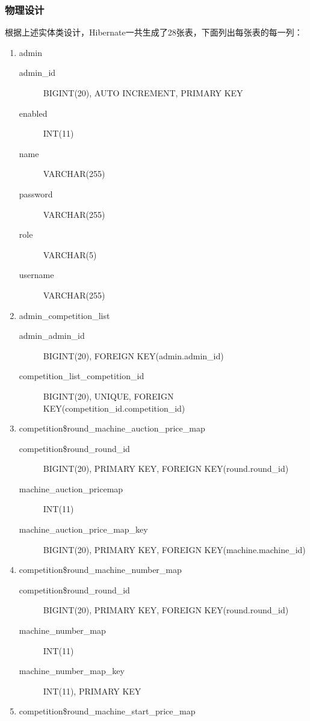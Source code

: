 \documentclass{article}
\begin{document}
\subsubsection{物理设计}
根据上述实体类设计，Hibernate一共生成了28张表，下面列出每张表的每一列：
\small{
\begin{enumerate}
  \item admin
    \begin{description}
      \item [admin\_id] BIGINT(20), AUTO INCREMENT, PRIMARY KEY
      \item [enabled] INT(11)
      \item [name] VARCHAR(255)
      \item [password] VARCHAR(255)
      \item [role] VARCHAR(5)
      \item [username] VARCHAR(255)
    \end{description}
  \item admin\_competition\_list
    \begin{description}
      \item[admin\_admin\_id] BIGINT(20), FOREIGN KEY(admin.admin\_id)
      \item[competition\_list\_competition\_id] BIGINT(20), UNIQUE, FOREIGN KEY(competition\_id.competition\_id)
    \end{description}
  \item competition\$round\_machine\_auction\_price\_map
    \begin{description}
      \item[competition\$round\_round\_id] BIGINT(20), PRIMARY KEY, FOREIGN KEY(round.round\_id)
      \item[machine\_auction\_pricemap] INT(11)
      \item[machine\_auction\_price\_map\_key] BIGINT(20), PRIMARY KEY, FOREIGN KEY(machine.machine\_id)
    \end{description}
  \item competition\$round\_machine\_number\_map
    \begin{description}
      \item[competition\$round\_round\_id] BIGINT(20), PRIMARY KEY, FOREIGN KEY(round.round\_id)
      \item[machine\_number\_map] INT(11)
      \item[machine\_number\_map\_key] INT(11), PRIMARY KEY
    \end{description}
  \item competition\$round\_machine\_start\_price\_map

\end{enumerate}}
\end{document}

